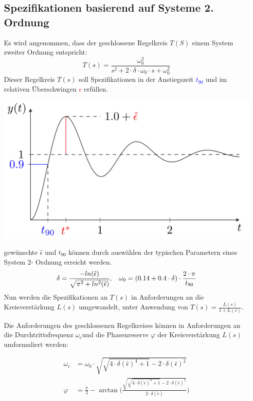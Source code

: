     \subsection{Spezifikationen basierend auf   Systeme 2. Ordnung}
        Es wird angenommen, dass der geschlossene Regelkreis $T(S)$ einem System zweiter Ordnung entspricht:
        \[T(s) = \frac{\omega_0^2}{s^2+2\cdot\delta\cdot\omega_0\cdot s+\omega_0^2}\] 
        Dieser Regelkreis $T(s)$ soll Spezifikationen in der Anstiegszeit \textcolor{blue}{$t_{90}$} und im relativen Überschwingen \textcolor{red}{$\hat{\epsilon}$} erfüllen.
        \begin{center}
            \includegraphics[width = 0.8\linewidth]{images/08/t90_epsilon.jpg}
        \end{center}
    
        gewünschte $\hat{\epsilon}$ und $t_{90}$ können durch auswählen der typischen Parametern eines System 2- Ordnung erreicht werden.
        \[\delta = \frac{-ln(\hat{\epsilon})}{\sqrt{\pi^2+ln^2(\hat{\epsilon})}}, \hspace{3mm} \omega_0 = (0.14 +0.4\cdot\delta)\cdot\frac{2\cdot\pi}{t_{90}} \]
        Nun werden die Spezifikationen an $T(s)$ in Anforderungen an die Kreisverstärkung $L(s)$ umgewandelt, unter Anwendung von $T(s) = \frac{L(s)}{1+L(s)}$.
    
        Die Anforderungen des geschlossenen Regelkreises können in Anforderungen an die Durchtrittsfrequenz $\omega_c$und die Phasenreserve $\varphi$ der Kreisverstärkung $L(s)$ umformuliert werden:
    
        \begin{align*}
            \omega_c &= \omega_0\cdot \sqrt{\sqrt{4\cdot\delta(\hat{\epsilon})^4+1}-2\cdot\delta(\hat{\epsilon})^2}\\
            \varphi &= \frac{\pi}{2}-\arctan\Bigg(\frac{ 
            \sqrt{\sqrt{4\cdot\delta(\hat{\epsilon})^4+1}-2\cdot\delta(\hat{\epsilon})^2}}{2\cdot\delta(\hat{\epsilon})}\Bigg)
        \end{align*}
    
